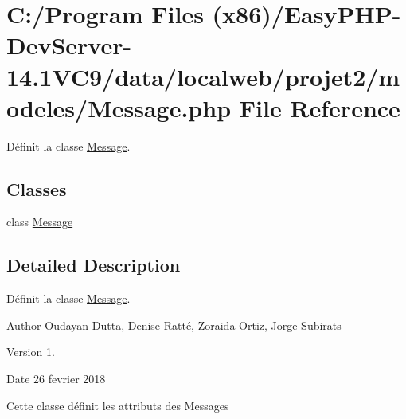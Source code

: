 \hypertarget{_message_8php}{}\section{C\+:/\+Program Files (x86)/\+Easy\+P\+H\+P-\/\+Dev\+Server-\/14.1\+V\+C9/data/localweb/projet2/modeles/\+Message.php File Reference}
\label{_message_8php}


Définit la classe \hyperlink{class_message}{Message}.  


\subsection*{Classes}
\begin{DoxyCompactItemize}
\item 
class \hyperlink{class_message}{Message}
\end{DoxyCompactItemize}


\subsection{Detailed Description}
Définit la classe \hyperlink{class_message}{Message}. 

\begin{DoxyAuthor}{Author}
Oudayan Dutta, Denise Ratté, Zoraida Ortiz, Jorge Subirats 
\end{DoxyAuthor}
\begin{DoxyVersion}{Version}
1. 
\end{DoxyVersion}
\begin{DoxyDate}{Date}
26 fevrier 2018
\end{DoxyDate}
Cette classe définit les attributs des Messages 